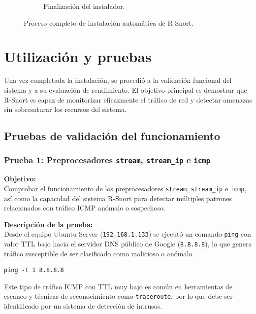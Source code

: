\documentclass[11pt,a4paper,twoside]{report}
\begin{document}
\begin{figure}[H]
\begin{subfigure}[b]{0.48\textwidth}
		\caption{Finalización del instalador.}
		\label{fig:finalizacion}
	\end{subfigure}
	\vspace{1em}
	\caption{Proceso completo de instalación automática de R-Snort.}
	\label{fig:instalacion}
\end{figure}

\pagebreak



\section{Utilización y pruebas}

Una vez completada la instalación, se procedió a la validación funcional del sistema y a su evaluación de rendimiento. El objetivo principal es demostrar que R-Snort es capaz de monitorizar eficazmente el tráfico de red y detectar amenazas sin sobresaturar los recursos del sistema.

\subsection{Pruebas de validación del funcionamiento}

\subsubsection*{Prueba 1: Preprocesadores \texttt{stream}, \texttt{stream\_ip} e \texttt{icmp}}

\textbf{Objetivo:} \\
Comprobar el funcionamiento de los preprocesadores \texttt{stream}, \texttt{stream\_ip} e \texttt{icmp}, así como la capacidad del sistema R-Snort para detectar múltiples patrones relacionados con tráfico ICMP anómalo o sospechoso.\newline

\textbf{Descripción de la prueba:} \\
Desde el equipo Ubuntu Server (\texttt{192.168.1.133}) se ejecutó un comando \texttt{ping} con valor TTL bajo hacia el servidor DNS público de Google (\texttt{8.8.8.8}), lo que genera tráfico susceptible de ser clasificado como malicioso o anómalo.

\begin{lstlisting}[style=commandstyle]
	ping -t 1 8.8.8.8
\end{lstlisting}

Este tipo de tráfico ICMP con TTL muy bajo es común en herramientas de escaneo y técnicas de reconocimiento como \texttt{traceroute}, por lo que debe ser identificado por un sistema de detección de intrusos.\newline
\end{document}
